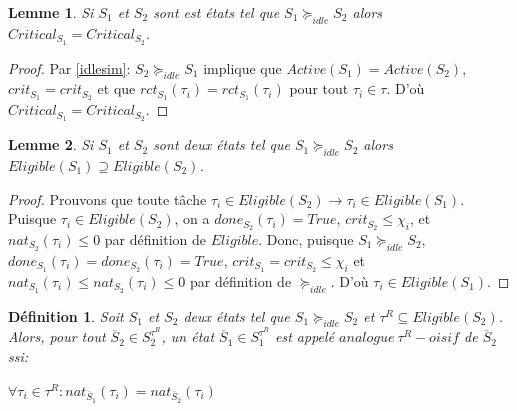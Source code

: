 \documentclass[a4paper]{report}
\theoremstyle{break}
\newtheorem{defin}{Définition}
\theoremstyle{breakplain}
\newtheorem{lem}{Lemme}
\begin{document}
\begin{lem}
\label{criteq}
Si $S_1$ et $S_2$ sont est états tel que $S_1 \succeq_{idle} S_2$ alors $Critical_{S_1} = Critical_{S_2}$.
\end{lem}
\begin{proof} Par \autoref{idlesim}: $S_2 \succeq_{idle} S_1$ implique que $Active(S_1) = Active(S_2)$, $crit_{S_1} = crit_{S_2}$ et que $rct_{S_1}(\tau_i) = rct_{S_1}(\tau_i)$ pour tout $\tau_i \in \tau$. D'où $Critical_{S_1} = Critical_{S_2}$.
\end{proof}





\begin{lem}
\label{elisuper}
Si $S_1$ et $S_2$ sont deux états tel que $S_1 \succeq_{idle}S_2$ alors $Eligible(S_1) \supseteq Eligible(S_2)$.
\end{lem}
\begin{proof} Prouvons que toute tâche $\tau_i \in Eligible(S_2) \rightarrow \tau_i \in Eligible(S_1)$. Puisque $\tau_i \in Eligible(S_2)$, on a $done_{S_2}(\tau_i) = True$,  $crit_{S_2} \leq \chi_i$, et $nat_{S_2}(\tau_i) \leq 0$ par définition de $Eligible$. Donc, puisque $S_1 \succeq_{idle}S_2$, $done_{S_1}(\tau_i) = done_{S_2}(\tau_i) = True$,  $crit_{S_1} = crit_{S_2} \leq \chi_i$ et $nat_{S_1}(\tau_i) \leq nat_{S_2}(\tau_i) \leq 0$ par définition de $\succeq_{idle}$. D'où $\tau_i \in Eligible(S_1)$.
\end{proof}

\begin{defin}
\label{reqanalogue}
Soit $S_1$ et $S_2$ deux états tel que $S_1 \succeq_{idle}S_2$ et $\tau^R \subseteq Eligible(S_2)$. Alors, pour tout $\overline{S}_2\in S_2^{\tau^R}$, un état  $\overline{S}_1\in S_1^{\tau^R}$ est appelé $analogue\ \tau^R-oisif$ de $\overline{S}_2$ ssi:
\begin{center}
$\forall \tau_i \in \tau^R : nat_{\overline{S}_1}(\tau_i) = nat_{\overline{S}_2}(\tau_i) $
\end{center}
\end{defin}
\end{document}
